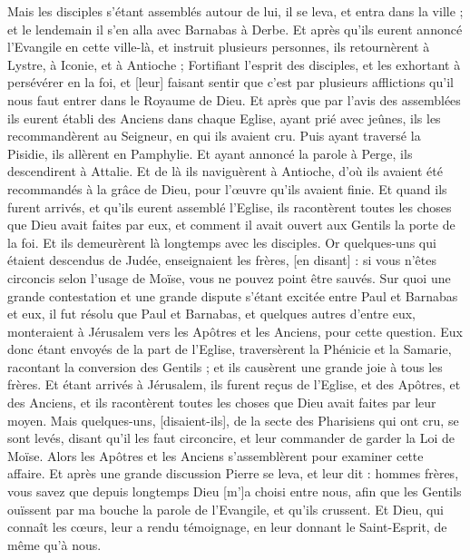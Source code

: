 \begin{multicols}{2}
Mais les disciples s'étant assemblés autour de lui, il se leva, et entra dans la ville ; et le lendemain il s'en alla avec Barnabas à Derbe.
Et après qu'ils eurent annoncé l'Evangile en cette ville-là, et instruit plusieurs personnes, ils retournèrent à Lystre, à Iconie, et à Antioche ;
Fortifiant l'esprit des disciples, et les exhortant à persévérer en la foi, et [leur] faisant sentir que c'est par plusieurs afflictions qu'il nous faut entrer dans le Royaume de Dieu.
Et après que par l'avis des assemblées ils eurent établi des Anciens dans chaque Eglise, ayant prié avec jeûnes, ils les recommandèrent au Seigneur, en qui ils avaient cru.
Puis ayant traversé la Pisidie, ils allèrent en Pamphylie.
Et ayant annoncé la parole à Perge, ils descendirent à Attalie.
Et de là ils naviguèrent à Antioche, d'où ils avaient été recommandés à la grâce de Dieu, pour l'œuvre qu'ils avaient finie.
Et quand ils furent arrivés, et qu'ils eurent assemblé l'Eglise, ils racontèrent toutes les choses que Dieu avait faites par eux, et comment il avait ouvert aux Gentils la porte de la foi.
Et ils demeurèrent là longtemps avec les disciples.
\VerseOne{}Or quelques-uns qui étaient descendus de Judée, enseignaient les frères, [en disant] : si vous n'êtes circoncis selon l'usage de Moïse, vous ne pouvez point être sauvés.
Sur quoi une grande contestation et une grande dispute s'étant excitée entre Paul et Barnabas et eux, il fut résolu que Paul et Barnabas, et quelques autres d'entre eux, monteraient à Jérusalem vers les Apôtres et les Anciens, pour cette question.
Eux donc étant envoyés de la part de l'Eglise, traversèrent la Phénicie et la Samarie, racontant la conversion des Gentils ; et ils causèrent une grande joie à tous les frères.
Et étant arrivés à Jérusalem, ils furent reçus de l'Eglise, et des Apôtres, et des Anciens, et ils racontèrent toutes les choses que Dieu avait faites par leur moyen.
Mais quelques-uns, [disaient-ils], de la secte des Pharisiens qui ont cru, se sont levés, disant qu'il les faut circoncire, et leur commander de garder la Loi de Moïse.
Alors les Apôtres et les Anciens s'assemblèrent pour examiner cette affaire.
Et après une grande discussion Pierre se leva, et leur dit : hommes frères, vous savez que depuis longtemps Dieu [m']a choisi entre nous, afin que les Gentils ouïssent par ma bouche la parole de l'Evangile, et qu'ils crussent.
Et Dieu, qui connaît les cœurs, leur a rendu témoignage, en leur donnant le Saint-Esprit, de même qu'à nous.

\end{multicols}

